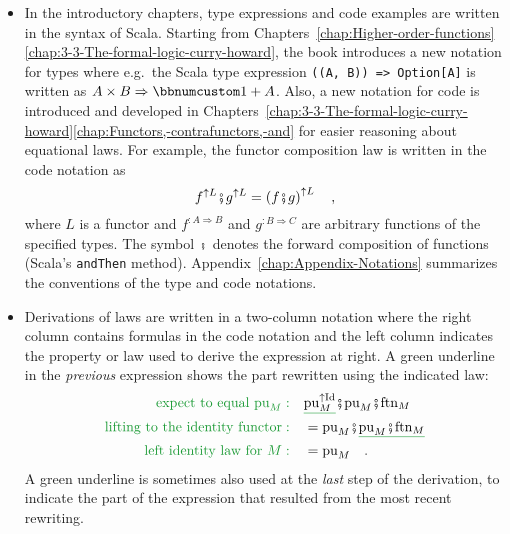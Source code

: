 \begin{itemize}
\item In the introductory chapters, type expressions and code examples are
written in the syntax of Scala. Starting from Chapters~\ref{chap:Higher-order-functions}\textendash \ref{chap:3-3-The-formal-logic-curry-howard},
the book introduces a new notation for types where e.g.~the Scala
type expression \lstinline!((A, B)) => Option[A]! is written as $A\times B\Rightarrow\bbnum 1+A$.
Also, a new notation for code is introduced and developed in Chapters~\ref{chap:3-3-The-formal-logic-curry-howard}\textendash \ref{chap:Functors,-contrafunctors,-and}
for easier reasoning about equational laws. For example, the functor
composition law is written in the code notation as
\[
f^{\uparrow L}\bef g^{\uparrow L}=\left(f\bef g\right)^{\uparrow L}\quad,
\]
where $L$ is a functor and $f^{:A\Rightarrow B}$ and $g^{:B\Rightarrow C}$
are arbitrary functions of the specified types. The symbol $\bef$
denotes the forward composition of functions (Scala's \lstinline!andThen!
method). Appendix~\ref{chap:Appendix-Notations} summarizes the conventions
of the type and code notations.
\item Derivations of laws are written in a two-column notation where the
right column contains formulas in the code notation and the left column
indicates the property or law used to derive the expression at right.
A green underline in the \emph{previous} expression shows the part
rewritten using the indicated law:
\begin{align*}
{\color{greenunder}\text{expect to equal }\text{pu}_{M}:}\quad & \gunderline{\text{pu}_{M}^{\uparrow\text{Id}}}\bef\text{pu}_{M}\bef\text{ftn}_{M}\\
{\color{greenunder}\text{lifting to the identity functor}:}\quad & =\text{pu}_{M}\bef\gunderline{\text{pu}_{M}\bef\text{ftn}_{M}}\\
{\color{greenunder}\text{left identity law for }M:}\quad & =\text{pu}_{M}\quad.
\end{align*}
A green underline is sometimes also used at the \emph{last} step of
the derivation, to indicate the part of the expression that resulted
from the most recent rewriting.
\end{itemize}

